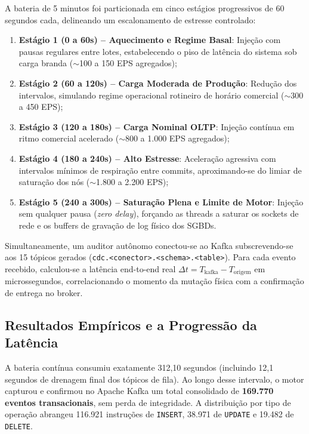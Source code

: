 \documentclass[12pt]{article}
\begin{document}
A bateria de 5 minutos foi particionada em cinco estágios progressivos de 60 segundos cada, delineando um escalonamento de estresse controlado:
\begin{enumerate}
  \item \textbf{Estágio 1 (0 a 60s) -- Aquecimento e Regime Basal}: Injeção com pausas regulares entre lotes, estabelecendo o piso de latência do sistema sob carga branda ($\sim$100 a 150 EPS agregados);
  \item \textbf{Estágio 2 (60 a 120s) -- Carga Moderada de Produção}: Redução dos intervalos, simulando regime operacional rotineiro de horário comercial ($\sim$300 a 450 EPS);
  \item \textbf{Estágio 3 (120 a 180s) -- Carga Nominal OLTP}: Injeção contínua em ritmo comercial acelerado ($\sim$800 a 1.000 EPS agregados);
  \item \textbf{Estágio 4 (180 a 240s) -- Alto Estresse}: Aceleração agressiva com intervalos mínimos de respiração entre commits, aproximando-se do limiar de saturação dos nós ($\sim$1.800 a 2.200 EPS);
  \item \textbf{Estágio 5 (240 a 300s) -- Saturação Plena e Limite de Motor}: Injeção sem qualquer pausa (\textit{zero delay}), forçando as threads a saturar os sockets de rede e os buffers de gravação de log físico dos SGBDs.
\end{enumerate}

Simultaneamente, um auditor autônomo conectou-se ao Kafka subscrevendo-se aos 15 tópicos gerados (\texttt{cdc.<conector>.<schema>.<table>}). Para cada evento recebido, calculou-se a latência end-to-end real $\Delta t = T_{\text{kafka}} - T_{\text{origem}}$ em microssegundos, correlacionando o momento da mutação física com a confirmação de entrega no broker.

\subsection{Resultados Empíricos e a Progressão da Latência}
\label{sec:eval_results}

A bateria contínua consumiu exatamente 312,10 segundos (incluindo 12,1 segundos de drenagem final dos tópicos de fila). Ao longo desse intervalo, o motor capturou e confirmou no Apache Kafka um total consolidado de \textbf{169.770 eventos transacionais}, sem perda de integridade. A distribuição por tipo de operação abrangeu 116.921 instruções de \texttt{INSERT}, 38.971 de \texttt{UPDATE} e 19.482 de \texttt{DELETE}.
\end{document}
